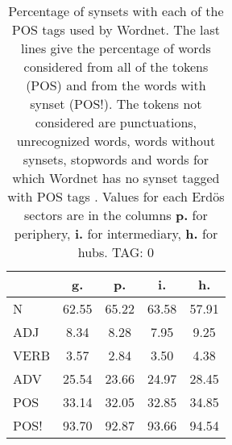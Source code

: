\begin{table}[h!]
\begin{center}
\begin{tabular}{| l | c | c | c | c |}\hline
 & g. & p. & i. & h. \\\hline
N & 62.55  & 65.22  & 63.58  & 57.91 \\\hline
ADJ & 8.34  & 8.28  & 7.95  & 9.25 \\\hline
VERB & 3.57  & 2.84  & 3.50  & 4.38 \\\hline
ADV & 25.54  & 23.66  & 24.97  & 28.45 \\\hline
POS & 33.14  & 32.05  & 32.85  & 34.85 \\\hline
POS! & 93.70  & 92.87  & 93.66  & 94.54 \\\hline
\end{tabular}
\caption{Percentage of synsets with each of the POS tags used by Wordnet. The last lines give the percentage of words considered from all of the tokens (POS) and from the words with synset (POS!). The tokens not considered are punctuations, unrecognized words, words without synsets, stopwords and words for which Wordnet has no synset  tagged with POS tags . Values for each Erd\"os sectors are in the columns {{\bf p.}} for periphery, {{\bf i.}} for intermediary, {{\bf h.}} for hubs. TAG: 0}
\end{center}
\end{table}